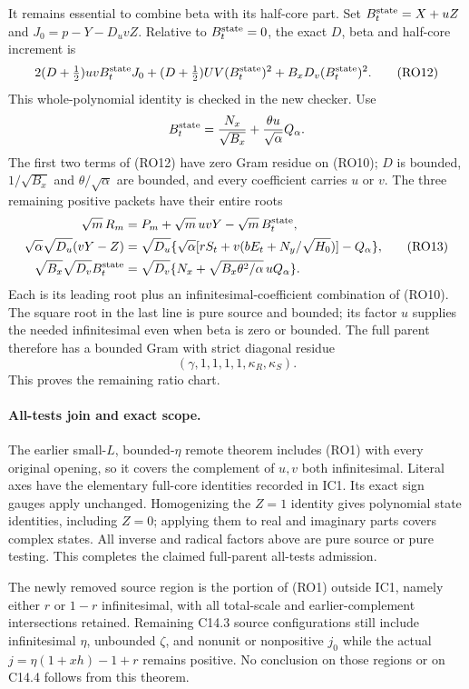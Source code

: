 It remains essential to combine beta with its half-core part. Set
$B_t^{\rm state}=X+uZ$ and $J_0=p-Y-D_uvZ$. Relative to
$B_t^{\rm state}=0$, the exact $D$, beta and half-core increment is
\[
 2(D+\tfrac12)uvB_t^{\rm state}J_0
 +(D+\tfrac12)UV(B_t^{\rm state})^2
 +B_xD_v(B_t^{\rm state})^2.                          \tag{RO12}
\]
This whole-polynomial identity is checked in the new checker. Use
\[
 B_t^{\rm state}={N_x\over\sqrt{B_x}}
               +{\theta u\over\sqrt\alpha}Q_\alpha.
\]
The first two terms of (RO12) have zero Gram residue on (RO10);
$D$ is bounded, $1/\sqrt{B_x}$ and $\theta/\sqrt\alpha$
are bounded, and every coefficient carries $u$ or $v$.
The three remaining positive packets have their entire roots
\[
\begin{aligned}
 \sqrt m\,R_m&=P_m+\sqrt m\,uvY-\sqrt m\,B_t^{\rm state},\\
 \sqrt\alpha\sqrt{D_u}(vY-Z)
   &=\sqrt{D_u}\{\sqrt\alpha[rS_t+v(bE_t+N_y/\sqrt{H_0})]
                         -Q_\alpha\},\\
 \sqrt{B_x}\sqrt{D_v}B_t^{\rm state}
   &=\sqrt{D_v}\{N_x+\sqrt{B_x\theta^2/\alpha}\,uQ_\alpha\}.
\end{aligned}                                                    \tag{RO13}
\]
Each is its leading root plus an infinitesimal-coefficient combination
of (RO10). The square root in the last line is pure source and bounded;
its factor $u$ supplies the needed infinitesimal even when beta is
zero or bounded. The full parent therefore has a bounded Gram with
strict diagonal residue
\[
                 (\gamma,1,1,1,1,\kappa_R,\kappa_S).
                                                               \tag{RO14}
\]
This proves the remaining ratio chart.

\paragraph{All-tests join and exact scope.}
The earlier small-$L$, bounded-$\eta$ remote theorem includes (RO1)
with every original opening, so it covers the complement of
$u,v$ both infinitesimal. Literal axes have the elementary full-core
identities recorded in IC1. Its exact sign gauges apply unchanged.
Homogenizing the $Z=1$ identity gives polynomial state identities,
including $Z=0$; applying them to real and imaginary parts covers
complex states. All inverse and radical factors above are pure
source or pure testing. This completes the claimed full-parent
all-tests admission.

The newly removed source region is the portion of (RO1) outside IC1,
namely either $r$ or $1-r$ infinitesimal, with all total-scale and
earlier-complement intersections retained. Remaining C14.3 source
configurations still include infinitesimal $\eta$, unbounded
$\zeta$, and nonunit or nonpositive $j_0$ while the actual
$j=\eta(1+xh)-1+r$ remains positive. No conclusion on those
regions or on C14.4 follows from this theorem.

